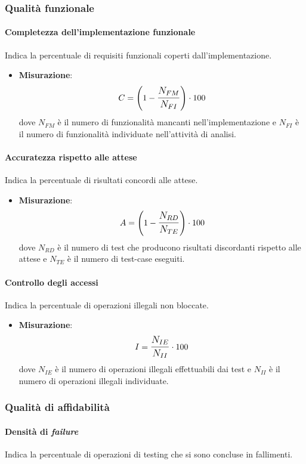 \subsubsection{Qualità funzionale}

\paragraph{Completezza dell'implementazione funzionale}
Indica la percentuale di requisiti funzionali coperti dall'implementazione.
\begin{itemize}
	\item \textbf{Misurazione}: 
		$$C=\left(1-\mathlarger{\frac{N_{FM}}{N_{FI}}}\right) \cdot 100$$ 
	dove $N_{FM}$ è il numero di funzionalità mancanti nell'implementazione e $N_{FI}$ è il numero di funzionalità individuate nell'attività di analisi.
\end{itemize}

\paragraph{Accuratezza rispetto alle attese}
Indica la percentuale di risultati concordi alle attese.
\begin{itemize}
	\item \textbf{Misurazione}: 
		$$A=\left(1-\mathlarger{\frac{N_{RD}}{N_{TE}}}\right) \cdot 100$$
	dove $N_{RD}$ è il numero di test che producono risultati discordanti rispetto alle attese e $N_{TE}$ è il numero di test-case eseguiti.
\end{itemize}

\paragraph{Controllo degli accessi}
Indica la percentuale di operazioni illegali non bloccate.
\begin{itemize}
	\item \textbf{Misurazione}: 
		$$I=\mathlarger{\frac{N_{IE}}{N_{II}}} \cdot 100$$
	dove $N_{IE}$ è il numero di operazioni illegali effettuabili dai test e $N_{II}$ è il numero di operazioni illegali individuate.
\end{itemize}

\subsubsection{Qualità di affidabilità}
\paragraph{Densità di \textit{failure}}
Indica la percentuale di operazioni di testing che si sono concluse in fallimenti.


